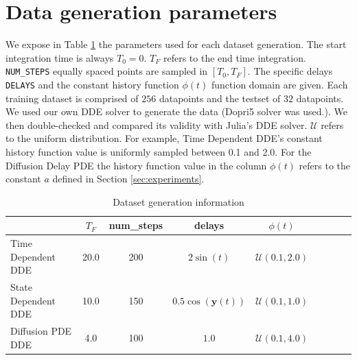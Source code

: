 \documentclass[pmlr]{jmlr}%
\begin{document}
\section{Data generation parameters} \label{ap:data_generation}

We expose in Table \ref{hyper_dataset} the parameters used for each dataset generation. The start integration time is always $T_0=0$. $T_F$ refers to the end time integration. \verb?NUM_STEPS? equally spaced points are sampled in $[T_0, T_F]$. The specific delays \verb?DELAYS? and the constant history function $\phi(t)$ function domain are given. Each training dataset is comprised of $256$ datapoints and the testset of $32$ datapoints. We used our own DDE solver to generate the data (Dopri5 solver \citep{dormand} was used.). We then double-checked and compared its validity with Julia’s DDE solver. $\mathcal{U}$ refers to the uniform distribution. For example, Time Dependent DDE's constant history function value is uniformly sampled between 0.1 and 2.0. For the Diffusion Delay PDE the history function value in the column $\phi(t)$ refers to the constant $a$ defined in Section \ref{sec:experiments}.

\begin{table}[H]
\vskip 0.15in
\begin{center}
\begin{small}
\begin{tabular}{lcccccccr}
\toprule
& $T_F$ & num\_steps & delays & $\phi(t)$ \\
\hline
Time Dependent DDE & 20.0 & 200 & $2\sin(t)$ & $\mathcal{U}(0.1, 2.0)$ \\
State Dependent DDE & 10.0 & 150 & $0.5 \cos(\mathbf{y}(t))$ & $\mathcal{U}(0.1, 1.0)$ \\
Diffusion PDE DDE & 4.0 & 100 & $1.0$ & $\mathcal{U}(0.1, 4.0)$ \\
\bottomrule
\end{tabular}
\end{small}
\end{center}
\caption{Dataset generation information}
\label{hyper_dataset}
\end{table}




\newpage
\end{document}

